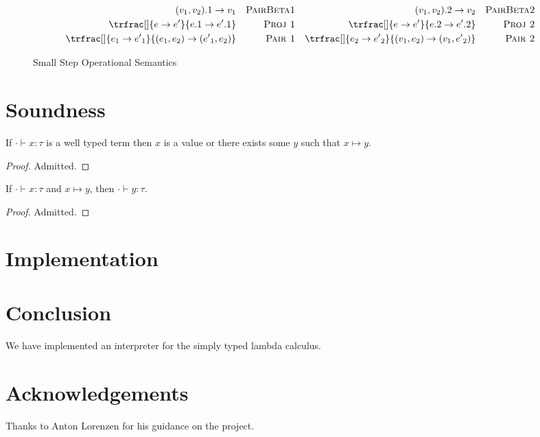 \documentclass[]{acmart}
\begin{document}
  \begin{figure}

    \begin{align*}
      (v_1, v_2).1 \rightarrow v_1 && \textsc{PairBeta1} && (v_1, v_2).2 \rightarrow v_2 && \textsc{PairBeta2} \\
      \trfrac[]{e \rightarrow {e'}}{e.1 \rightarrow {e'}.1} && \textsc{Proj 1} && \trfrac[]{e \rightarrow {e'}}{e.2 \rightarrow {e'}.2} && \textsc{Proj 2} \\
      \trfrac[]{e_1 \rightarrow {e'}_{1}}{(e_1, e_2)\rightarrow ({e'}_{1}, e_2)} && \textsc{Pair 1} && \trfrac[]{e_2 \rightarrow {e'}_{2}}{(v_1, e_2) \rightarrow (v_1, {e'}_{2})} && \textsc{Pair 2}
    \end{align*}

    \caption{Small Step Operational Semantics}
    \label{fig:ops}
  \end{figure}


  \section{Soundness}

  \begin{theorem}[Progress]
    If $\cdot \vdash x : \tau$ is a well typed term then $x$ is a value or there
    exists some $y$ such that $x \mapsto y$.
  \end{theorem}

  \begin{proof}
    Admitted.
  \end{proof}

  \begin{theorem}[Preservation]
    If $\cdot \vdash x : \tau$ and $x \mapsto y$, then $\cdot \vdash y : \tau$.
  \end{theorem}

  \begin{proof}
    Admitted.
  \end{proof}

  \section{Implementation}



  \section{Conclusion}

  We have implemented an interpreter for the simply typed lambda calculus.

  \section{Acknowledgements}

  Thanks to Anton Lorenzen for his guidance on the project.

  \printbibliography
\end{document}
